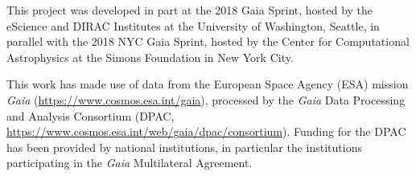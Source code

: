 \documentclass[preprint2]{aastex62}
\begin{document}
This project was developed in part at the 2018 Gaia Sprint, hosted by the eScience and DIRAC Institutes at the University of Washington, Seattle, in parallel with the 2018 NYC Gaia Sprint, hosted by the Center for Computational Astrophysics at the Simons Foundation in New York City.

This work has made use of data from the European Space Agency (ESA) mission
{\it Gaia} (\url{https://www.cosmos.esa.int/gaia}), processed by the {\it Gaia}
Data Processing and Analysis Consortium (DPAC,
\url{https://www.cosmos.esa.int/web/gaia/dpac/consortium}). Funding for the DPAC
has been provided by national institutions, in particular the institutions
participating in the {\it Gaia} Multilateral Agreement.




\end{document}
